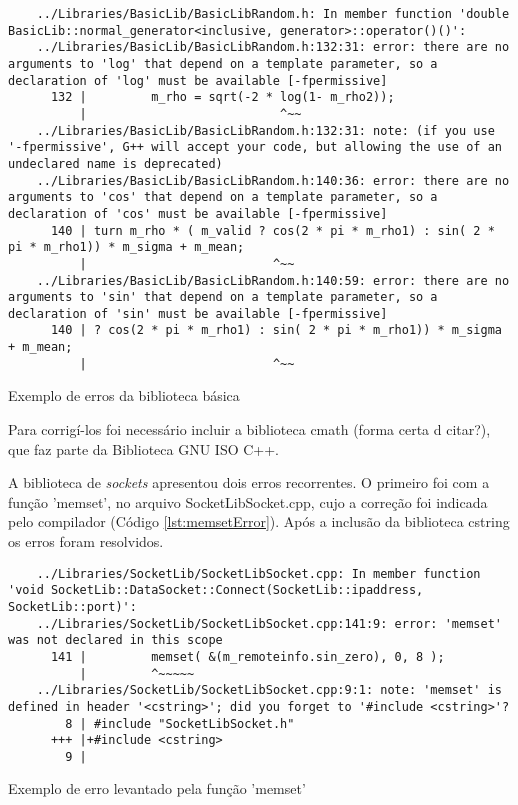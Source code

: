 \begin{listing}[!ht]
    \begin{verbatim}
    ../Libraries/BasicLib/BasicLibRandom.h: In member function 'double BasicLib::normal_generator<inclusive, generator>::operator()()':
    ../Libraries/BasicLib/BasicLibRandom.h:132:31: error: there are no arguments to 'log' that depend on a template parameter, so a declaration of 'log' must be available [-fpermissive]
      132 |         m_rho = sqrt(-2 * log(1- m_rho2));
          |                           ^~~
    ../Libraries/BasicLib/BasicLibRandom.h:132:31: note: (if you use '-fpermissive', G++ will accept your code, but allowing the use of an undeclared name is deprecated)
    ../Libraries/BasicLib/BasicLibRandom.h:140:36: error: there are no arguments to 'cos' that depend on a template parameter, so a declaration of 'cos' must be available [-fpermissive]
      140 | turn m_rho * ( m_valid ? cos(2 * pi * m_rho1) : sin( 2 * pi * m_rho1)) * m_sigma + m_mean;
          |                          ^~~
    ../Libraries/BasicLib/BasicLibRandom.h:140:59: error: there are no arguments to 'sin' that depend on a template parameter, so a declaration of 'sin' must be available [-fpermissive]
      140 | ? cos(2 * pi * m_rho1) : sin( 2 * pi * m_rho1)) * m_sigma + m_mean;
          |                          ^~~
    \end{verbatim}
\caption{Exemplo de erros da biblioteca básica}
\label{lst:mathError}
\end{listing}
        

Para corrigí-los foi necessário incluir a biblioteca cmath (forma certa d citar?), 
que faz parte da Biblioteca GNU ISO C++.


A biblioteca de \textit{sockets} apresentou dois erros recorrentes. O primeiro foi com a função 'memset',
no arquivo SocketLibSocket.cpp, cujo a correção foi indicada pelo compilador (Código \ref{lst:memsetError}). 
Após a inclusão da biblioteca cstring os erros foram resolvidos.

\begin{listing}[!ht]
    \begin{verbatim}
    ../Libraries/SocketLib/SocketLibSocket.cpp: In member function 'void SocketLib::DataSocket::Connect(SocketLib::ipaddress, SocketLib::port)':
    ../Libraries/SocketLib/SocketLibSocket.cpp:141:9: error: 'memset' was not declared in this scope
      141 |         memset( &(m_remoteinfo.sin_zero), 0, 8 );
          |         ^~~~~~
    ../Libraries/SocketLib/SocketLibSocket.cpp:9:1: note: 'memset' is defined in header '<cstring>'; did you forget to '#include <cstring>'?
        8 | #include "SocketLibSocket.h"
      +++ |+#include <cstring>
        9 | 
    \end{verbatim}
\caption{Exemplo de erro levantado pela função 'memset'}
\label{lst:memsetError}
\end{listing}

